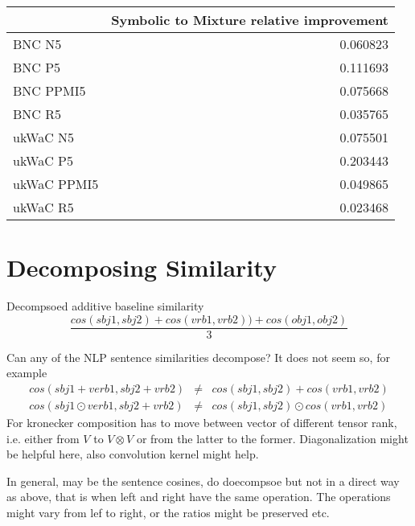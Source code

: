 \begin{tabular}{lr}
\toprule
{} &         Symbolic to Mixture relative improvement \\
\midrule
BNC N5      &  0.060823 \\
BNC P5      &  0.111693 \\
BNC PPMI5   &  0.075668 \\
BNC R5      &  0.035765 \\
ukWaC N5    &  0.075501 \\
ukWaC P5    &  0.203443 \\
ukWaC PPMI5 &  0.049865 \\
ukWaC R5    &  0.023468 \\
\bottomrule
\end{tabular}

\section{Decomposing Similarity}
Decompsoed additive baseline similarity
\[
\frac{cos(sbj1,sbj2) + cos(vrb1,vrb2)) + cos(obj1,obj2)}{3}
\]

Can any of the NLP sentence similarities decompose? It does not seem so, for example
\begin{eqnarray*}
cos(sbj1+verb1,sbj2+vrb2) &\neq& cos(sbj1, sbj2) + cos(vrb1,vrb2) \\
cos(sbj1\odot verb1,sbj2+vrb2) &\neq& cos(sbj1, sbj2) \odot cos(vrb1,vrb2)
\end{eqnarray*}
For kronecker composition has to move between vector of different tensor rank, i.e. either from $V$ to $V \otimes V$ or from the latter to the former. Diagonalization might be helpful here, also convolution kernel might help. 

In general, may be the sentence cosines, do doecompsoe but not in a direct way as above, that is when left and right have the same operation. The operations might vary from lef to right, or the ratios might be preserved etc. 
